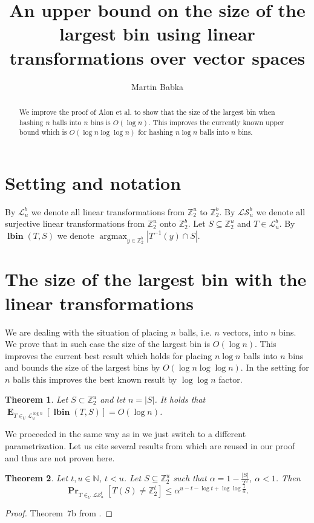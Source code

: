 \documentclass{article}
\title{An upper bound on the size of the largest bin using linear transformations over vector spaces}
\author{Martin Babka}
\newcommand{\lbin}[2]{\operatorname{\mathbf{lbin}}({#1}, {#2})}
\newcommand{\vecspace}[2]{\mathbb{Z}_{#1}^{#2}}
\newcommand{\binvecspace}[1]{\vecspace{2}{#1}}
\newcommand{\linearmaps}[2]{\mathcal{L}_{#1}^{#2}}
\newcommand{\surjectivelinearmaps}[2]{\mathcal{LS}_{#1}^{#2}}
\newcommand{\probs}[2]{\operatorname{\mathbf{Pr}}_{{#1}}\left[{#2}\right]}
\newcommand{\expects}[2]{\operatorname{\mathbf{E}}_{{#1}}\left[{#2}\right]}
\newtheorem{theorem}{Theorem}
\begin{document}
\maketitle

\begin{abstract}
We improve the proof of Alon et al. to show that the size of the largest bin when hashing $n$ balls into $n$ bins is $O(\log n)$. This improves the currently known upper bound which is $O(\log n \log \log n)$ for hashing $n \log n$ balls into $n$ bins.
\end{abstract}

\section{Setting and notation}
By $\linearmaps{u}{b}$ we denote all linear transformations from $\binvecspace{u}$ to $\binvecspace{b}$.
By $\surjectivelinearmaps{u}{b}$ we denote all surjective linear transformations from $\binvecspace{u}$ onto $\binvecspace{b}$.
Let $S \subseteq \binvecspace{u}$ and $T \in \linearmaps{u}{b}$. By $\lbin{T}{S}$ we denote $\operatorname{argmax}_{y \in \binvecspace{b}} |T^{-1}(y) \cap S|$.

\section{The size of the largest bin with the linear transformations}

We are dealing with the situation of placing $n$ balls, i.e. $n$ vectors, into $n$ bins.
We prove that in such case the size of the largest bin is $O(\log n)$. 
This improves the current best result which holds for placing $n \log n$ balls into $n$ bins and bounds the size of the largest bins by $O(\log n \log \log n)$.
In the setting for $n$ balls this improves the best known result by  $\log \log n$ factor.
\begin{theorem}
\label{theorem-n-to-n}
Let $S \subset \binvecspace{u}$ and let $n = |S|$. It holds that $\expects{T \in_U \linearmaps{u}{\log n}}{\lbin{T}{S}} = O(\log n)$.
\end{theorem}
We proceeded in the same way as in \cite{alonetal} we just switch to a different parametrization.
Let us cite several results from \cite{alonetal} which are reused in our proof and thus are not proven here.
\begin{theorem}
\label{theorem-prob-bound}
Let $t, u \in \mathbb{N}$, $t < u$.
Let $S \subseteq \binvecspace{u}$ such that $\alpha = 1 - \frac{|S|}{2^u}$, $\alpha < 1$.
Then 
\[
\probs{T \in_U \surjectivelinearmaps{u}{t}}{T(S) \neq \binvecspace{t}} \leq \alpha^{u - t - \log t + \log \log \frac{1}{\alpha}}.
\]
\end{theorem}
\begin{proof}
Theorem~{7b} from \cite{alonetal}.
\end{proof}
\end{document}
